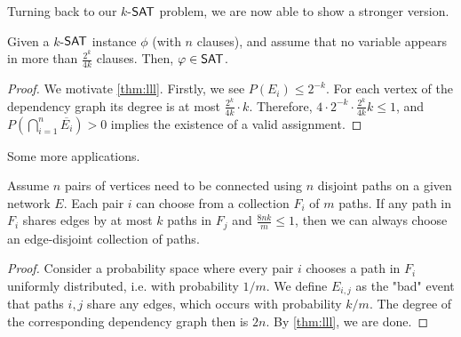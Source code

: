 Turning back to our $k$-$\mathsf{SAT}$ problem, we are now able to show a stronger version.
\begin{theorem}
    Given a $k$-$\mathsf{SAT}$ instance $\phi$ (with $n$ clauses), and
    assume that no variable appears in more than $\frac{2^k}{4k}$ clauses.
    Then, $\phi \in \SAT$.
\end{theorem}
\begin{proof}
    We motivate \autoref{thm:lll}.
    Firstly, we see $P(E_i) \leq 2^{-k}$.
    For each vertex of the dependency graph its degree is at most $\frac{2^k}{4k}\cdot k$.
    Therefore, $4 \cdot 2^{-k} \cdot \frac{2^k}{4k}k \leq 1$, and $P(\bigcap_{i=1}^n \overline{E_i}) > 0$ implies the existence of a valid assignment.
\end{proof}
Some more applications.
\begin{theorem}
    Assume $n$ pairs of vertices need to be connected using $n$ disjoint paths on
    a given network $E$.
    Each pair $i$ can choose from a collection $F_i$ of $m$ paths.
    If any path in $F_i$ shares edges by at most $k$ paths in $F_j$
    and $\frac{8nk}{m} \leq 1$, then we can always choose an edge-disjoint collection of paths.
\end{theorem}
\begin{proof}
    Consider a probability space where every pair $i$ chooses a path in $F_i$ uniformly distributed, i.e. with probability $1/m$.
    We define $E_{i,j}$ as the "bad" event that paths $i,j$ share any edges,
    which occurs with probability $k/m$.
    The degree of the corresponding dependency graph then is $2n$.
    By \autoref{thm:lll}, we are done.

\end{proof}